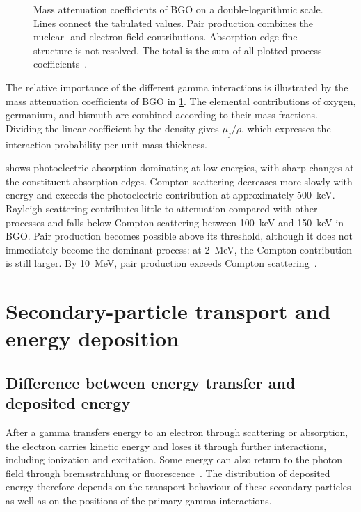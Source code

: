 \begin{figure}[H]
  \centering
  \caption{Mass attenuation coefficients of BGO on a double-logarithmic scale. Lines connect the tabulated values. Pair production combines the nuclear- and electron-field contributions. Absorption-edge fine structure is not resolved. The total is the sum of all plotted process coefficients~\parencite{nistxcom}.}
  \label{fig:foundations-attenuation}
\end{figure}

The relative importance of the different gamma interactions is illustrated by the mass attenuation coefficients of BGO in \cref{fig:foundations-attenuation}. The elemental contributions of oxygen, germanium, and bismuth are combined according to their mass fractions. Dividing the linear coefficient by the density gives $\mu_j/\rho$, which expresses the interaction probability per unit mass thickness.

 shows photoelectric absorption dominating at low energies, with sharp changes at the constituent absorption edges. Compton scattering decreases more slowly with energy and exceeds the photoelectric contribution at approximately \qty{500}{\kilo\electronvolt}. Rayleigh scattering contributes little to attenuation compared with other processes and falls below Compton scattering between \qty{100}{\kilo\electronvolt} and \qty{150}{\kilo\electronvolt} in BGO. Pair production becomes possible above its threshold, although it does not immediately become the dominant process: at \qty{2}{\mega\electronvolt}, the Compton contribution is still larger. By \qty{10}{\mega\electronvolt}, pair production exceeds Compton scattering~\parencite{nistxcom}.

\section{Secondary-particle transport and energy deposition}
\subsection{Difference between energy transfer and deposited energy}

After a gamma transfers energy to an electron through scattering or absorption, the electron carries kinetic energy and loses it through further interactions, including ionization and excitation. Some energy can also return to the photon field through bremsstrahlung or fluorescence~\parencite{hubbell1995energy}. The distribution of deposited energy therefore depends on the transport behaviour of these secondary particles as well as on the positions of the primary gamma interactions.

